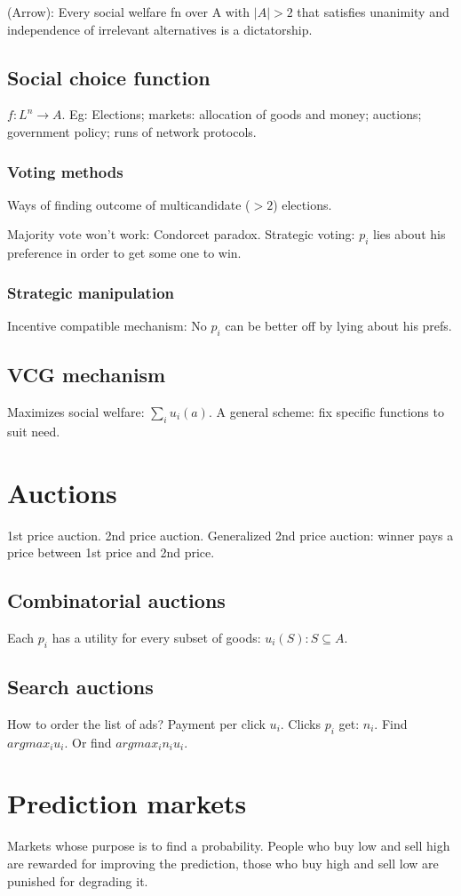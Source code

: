 \documentclass[oneside, article]{memoir}
\begin{document}
(Arrow): Every social welfare fn over A with $|A|>2$ that satisfies unanimity and independence of irrelevant alternatives is a dictatorship.

\subsection{Social choice function}
$f:L^{n} \to A$. Eg: Elections; markets: allocation of goods and money; auctions; government policy; runs of network protocols.

\subsubsection{Voting methods}
Ways of finding outcome of multicandidate ($>2$) elections.

Majority vote won't work: Condorcet paradox. Strategic voting: $p_{i}$ lies about his preference in order to get some one to win.

\subsubsection{Strategic manipulation}
Incentive compatible mechanism: No $p_{i}$ can be better off by lying about his prefs.

\subsection{VCG mechanism}
Maximizes social welfare: $\sum_{i} u_{i}(a)$. A general scheme: fix specific functions to suit need.

\section{Auctions}
1st price auction. 2nd price auction. Generalized 2nd price auction: winner pays a price between 1st price and 2nd price.

\subsection{Combinatorial auctions}
Each $p_{i}$ has a utility for every subset of goods: $u_{i}(S): S \subseteq A$.

\subsection{Search auctions}
How to order the list of ads? Payment per click $u_{i}$. Clicks $p_{i}$ get: $n_{i}$. Find $argmax_{i} u_{i}$. Or find $argmax_{i} n_{i}u_{i}$.

\tbc

\section{Prediction markets}
Markets whose purpose is to find a probability. People who buy low and sell high are rewarded for improving the prediction, those who buy high and sell low are punished for degrading it.



\end{document}
